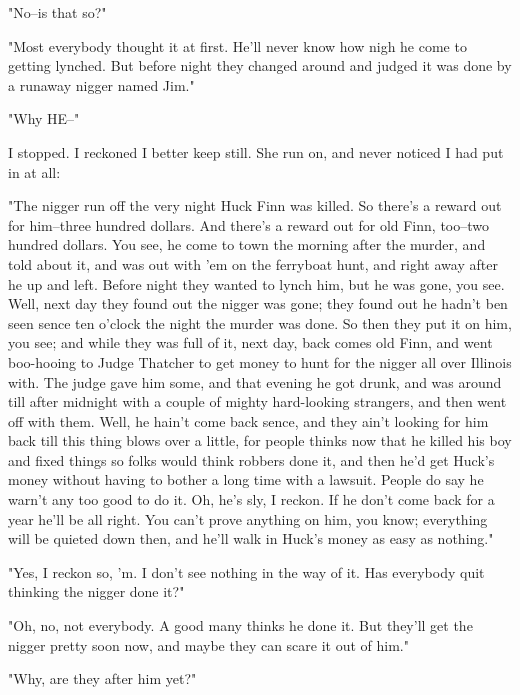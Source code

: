 "No--is that so?"

"Most everybody thought it at first.  He'll never know how nigh he come
to getting lynched.  But before night they changed around and judged it
was done by a runaway nigger named Jim."

"Why HE--"

I stopped.  I reckoned I better keep still.  She run on, and never
noticed I had put in at all:

"The nigger run off the very night Huck Finn was killed.  So there's a
reward out for him--three hundred dollars.  And there's a reward out for
old Finn, too--two hundred dollars.  You see, he come to town the morning
after the murder, and told about it, and was out with 'em on the
ferryboat hunt, and right away after he up and left.  Before night they
wanted to lynch him, but he was gone, you see.  Well, next day they found
out the nigger was gone; they found out he hadn't ben seen sence ten
o'clock the night the murder was done.  So then they put it on him, you
see; and while they was full of it, next day, back comes old Finn, and
went boo-hooing to Judge Thatcher to get money to hunt for the nigger all
over Illinois with. The judge gave him some, and that evening he got
drunk, and was around till after midnight with a couple of mighty
hard-looking strangers, and then went off with them.  Well, he hain't
come back sence, and they ain't looking for him back till this thing
blows over a little, for people thinks now that he killed his boy and
fixed things so folks would think robbers done it, and then he'd get
Huck's money without having to bother a long time with a lawsuit.  People
do say he warn't any too good to do it.  Oh, he's sly, I reckon.  If he
don't come back for a year he'll be all right.  You can't prove anything
on him, you know; everything will be quieted down then, and he'll walk in
Huck's money as easy as nothing."

"Yes, I reckon so, 'm.  I don't see nothing in the way of it.  Has
everybody quit thinking the nigger done it?"

"Oh, no, not everybody.  A good many thinks he done it.  But they'll get
the nigger pretty soon now, and maybe they can scare it out of him."

"Why, are they after him yet?"

